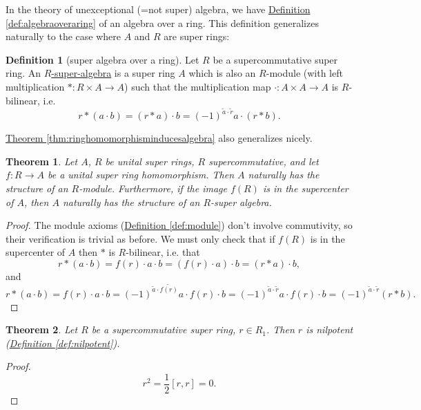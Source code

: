 \documentclass[a4paper]{report}
\newcommand{\defn}[1]{\ul{#1}}
\theoremstyle{definition}
\newtheorem{definition}{Definition}[section]
\theoremstyle{plain}
\newtheorem{theorem}{Theorem}[section]
\theoremstyle{remark}
\begin{document}
In the theory of unexceptional (=not super) algebra, we have \hyperref[def:algebraoveraring]{Definition \ref*{def:algebraoveraring}} of an algebra over a ring. This definition generalizes naturally to the case where $A$ and $R$ are super rings:
\begin{definition}[super algebra over a ring]
  \label{def:superalgebraoveraring}
  Let $R$ be a supercommutative super ring. An \defn{$R$-super-algebra} is a super ring $A$ which is also an $R$-module (with left multiplication $*\colon R \times A \to A$) such that the multiplication map $\cdot \colon A \times A \to A$ is $R$-bilinear, i.e.
  \begin{equation*}
    r*(a\cdot b) = (r*a)\cdot b = (-1)^{\tilde{a}\cdot \tilde{r}} a\cdot (r*b).
  \end{equation*}
\end{definition}
\hyperref[thm:ringhomomorphisminducesalgebra]{Theorem \ref*{thm:ringhomomorphisminducesalgebra}} also generalizes nicely.
\begin{theorem}
  Let $A$, $R$ be unital super rings, $R$ supercommutative, and let $f\colon R \to A$ be a unital super ring homomorphism. Then $A$ naturally has the structure of an $R$-module. Furthermore, if the image $f(R)$ is in the supercenter of $A$, then $A$ naturally has the structure of an $R$-super algebra.
\end{theorem}
\begin{proof}
  The module axioms (\hyperref[def:module]{Definition \ref*{def:module}}) don't involve commutivity, so their verification is trivial as before. We must only check that if $f(R)$ is in the supercenter of $A$ then $*$ is $R$-bilinear, i.e. that
  \begin{equation*}
    r*(a\cdot b) = f(r)\cdot a\cdot b = (f(r)\cdot a)\cdot b = (r*a)\cdot b,
  \end{equation*}
  and
  \begin{equation*}
    r*(a\cdot b) = f(r)\cdot a\cdot b = (-1)^{ \tilde{a}\cdot \widetilde{f(r)}}a\cdot f(r)\cdot b = (-1)^{\tilde{a}\cdot \tilde{r}}a\cdot f(r)\cdot b = (-1)^{\tilde{a}\cdot \tilde{r}}(r*b).
  \end{equation*}
\end{proof}

\begin{theorem}
  Let $R$ be a supercommutative super ring, $r \in R_{1}$. Then $r$ is nilpotent (\hyperref[def:nilpotent]{Definition \ref*{def:nilpotent}}).
\end{theorem}
\begin{proof}
  \begin{equation*}
    r^2 = \frac{1}{2}[r,r] = 0.
  \end{equation*}
\end{proof}
\end{document}

